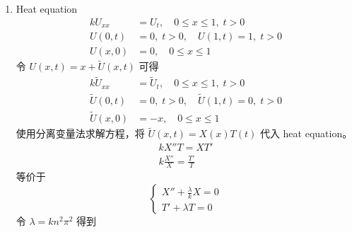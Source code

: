 \documentclass[a4paper]{article}
\begin{document}
\begin{enumerate}
\begin{equation*}
\begin{aligned}
                &= \frac{2}{\pi\sinh(n \pi)}\left[\frac{1}{n^2}(-1)^n - \frac{1}{n^2}\right] \\
                &= \frac{2((-1)^n - 1)}{n^2\pi\sinh(n \pi)}
            \end{aligned}
        \end{equation*}
        因而 $U(x,y)$ 为
        \begin{equation*}
            \begin{aligned}
                U(x,y) &= \sum_{n=1}^{\infty} \frac{2((-1)^n - 1)}{n^2\pi\sinh(n \pi)} \cos(nx) \sinh(n y)\\
                &= \sum_{m=0}^{\infty} \frac{-4}{(2m+1)^2\pi\sinh((2m+1) \pi)} \cos((2m+1)x) \sinh((2m+1) y)
            \end{aligned}
        \end{equation*}
    \item[(b)] Heat equation
        \begin{align*}
            kU_{xx} &= U_t, \quad 0 \leq x \leq 1, \; t > 0 \\
            U(0, t) &= 0, \; t > 0, \quad U(1, t) = 1, \; t > 0 \\
            U(x, 0) &= 0, \quad 0 \leq x \leq 1
        \end{align*}
        令 $U(x, t) = x + \tilde{U}(x,t)$ 可得
        \begin{align*}
            k\tilde{U}_{xx} &= \tilde{U}_t, \quad 0 \leq x \leq 1, \; t > 0 \\
            \tilde{U}(0, t) &= 0, \; t > 0, \quad \tilde{U}(1, t) = 0, \; t > 0 \\
            \tilde{U}(x, 0) &= -x, \quad 0 \leq x \leq 1
        \end{align*}
        使用分离变量法求解方程，将 \(\tilde{U}(x, t) = X(x)T(t)\) 代入 heat equation。
        \begin{gather*}
            kX''T = XT'\\
            k\frac{X''}{X} = \frac{T'}{T}
        \end{gather*}
        等价于
        \begin{equation*}
            \begin{cases}
                X'' + \frac{\lambda}{k} X = 0 \\
                T' + \lambda T = 0
            \end{cases}
        \end{equation*}
        令 $\lambda = kn^2\pi^2$ 得到
        \begin{equation*}

\end{equation*}
\end{enumerate}
\end{document}
